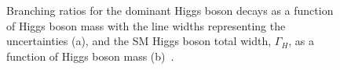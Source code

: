 \begin{figure}

  \caption{Branching ratios for the dominant Higgs boson decays as a function of Higgs boson mass with the line widths representing the uncertainties (a), and the \ac{SM} Higgs boson total width, $\Gamma_{H}$, as a function of Higgs boson mass (b)~\cite{Heinemeyer:1559921}.}
  \label{fig:smdecay}
\end{figure}


